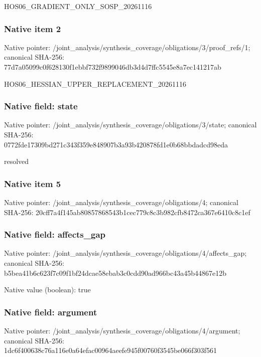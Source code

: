 \documentclass[10pt,a4paper]{article}
\begin{document}
\begingroup\raggedright\sloppy HOS06\_\allowbreak{}GRADIENT\_\allowbreak{}ONLY\_\allowbreak{}SOSP\_\allowbreak{}20261116\par\endgroup

\subsubsection{Native item 2}
Native pointer: /joint\_\allowbreak{}analysis/synthesis\_\allowbreak{}coverage/obligations/3/proof\_\allowbreak{}refs/1; canonical SHA-256: 77d7a05099c0f628130f1ebbf732f9899046db3d4d7ffc5545e8a7ec141217ab

\begingroup\raggedright\sloppy HOS06\_\allowbreak{}HESSIAN\_\allowbreak{}UPPER\_\allowbreak{}REPLACEMENT\_\allowbreak{}20261116\par\endgroup

\subsubsection{Native field: state}
Native pointer: /joint\_\allowbreak{}analysis/synthesis\_\allowbreak{}coverage/obligations/3/state; canonical SHA-256: 0772fde17309bd271c343f359e848907b3a93b420878fd1e0b68bbdadcd98eda

\begingroup\raggedright\sloppy resolved\par\endgroup

\subsubsection{Native item 5}
Native pointer: /joint\_\allowbreak{}analysis/synthesis\_\allowbreak{}coverage/obligations/4; canonical SHA-256: 20cff7a4f145ab80857868543b1cec779c8c3b982cfb8472ca367e6410c8c1ef

\subsubsection{Native field: affects\_\allowbreak{}gap}
Native pointer: /joint\_\allowbreak{}analysis/synthesis\_\allowbreak{}coverage/obligations/4/affects\_\allowbreak{}gap; canonical SHA-256: b5bea41b6c623f7c09f1bf24dcae58ebab3c0cdd90ad966bc43a45b44867e12b

Native value (boolean): true

\subsubsection{Native field: argument}
Native pointer: /joint\_\allowbreak{}analysis/synthesis\_\allowbreak{}coverage/obligations/4/argument; canonical SHA-256: 1dc6f400638c76a116e0a64efac00964aeefe945f00760f3545be066f303f561
\end{document}
